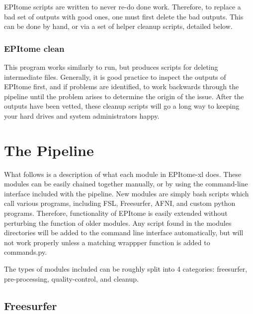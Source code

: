 \documentclass[final,titlepage,letterpaper,oneside,12pt]{article}
\renewcommand{\texttt}[2][BrickRed]{\textcolor{#1}{\ttfamily #2}}%
\begin{document}
EPItome scripts are written to never re-do done work. Therefore, to replace a bad set of outputs with good ones, one must first delete the bad outputs. This can be done by hand, or via a set of helper cleanup scripts, detailed below.

\subsubsection{EPItome clean}

This program works similarly to \texttt{run}, but produces scripts for deleting intermediate files. Generally, it is good practice to inspect the outputs of EPItome first, and if problems are identified, to work backwards through the pipeline until the problem arises to determine the origin of the issue. After the outputs have been vetted, these cleanup scripts will go a long way to keeping your hard drives and system administrators happy.

\section{The Pipeline}

What follows is a description of what each module in EPItome-xl does. These modules can be easily chained together manually, or by using the command-line interface included with the pipeline. New modules are simply bash scripts which call various programs, including FSL, Freesurfer, AFNI, and custom python programs. Therefore, functionality of EPItome is easily extended without perturbing the function of older modules. Any script found in the modules directories will be added to the command line interface automatically, but will not work properly unless a matching wrappper function is added to \texttt{commands.py}.

The types of modules included can be roughly split into 4 categories: freesurfer, pre-processing, quality-control, and cleanup.

\subsection{Freesurfer}
\end{document}
